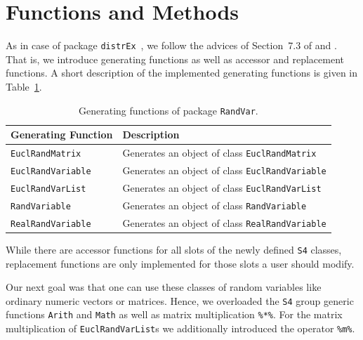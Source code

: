 \documentclass[11pt]{article}
\begin{document}
\section{Functions and Methods}
As in case of package {\tt distrEx}~\cite{distr}, we follow the advices of 
Section~7.3 of \cite{Cham:98} and \cite{Gent:03}. That is, we introduce 
generating functions as well as accessor and replacement functions. A short
description of the implemented generating functions is given in
Table~\ref{ap.Rpack.RandVar.tab.gen}.
\begin{table}[!ht]
\begin{center}
\begin{tabular}{p{4cm}|p{7.5cm}}
  \textbf{Generating Function} & \textbf{Description} \\ \hline\hline
  {\tt EuclRandMatrix} & Generates an object of class {\tt EuclRandMatrix}\\ \hline
  {\tt EuclRandVariable} & Generates an object of class {\tt EuclRandVariable}\\ \hline
  {\tt EuclRandVarList}   & Generates an object of class {\tt EuclRandVarList}\\ \hline
  {\tt RandVariable} & Generates an object of class {\tt RandVariable}\\ \hline
  {\tt RealRandVariable} & Generates an object of class {\tt RealRandVariable}
\end{tabular}
\caption[Generating Functions of Package {\tt RandVar}]{Generating
functions of package {\tt RandVar}.}\label{ap.Rpack.RandVar.tab.gen}%
\end{center}
\end{table}
\par\noindent
While there are accessor functions for all slots of the newly defined
{\tt S4} classes, replacement functions are only implemented for those
slots a user should modify.
\par
Our next goal was that one can use these classes of random variables like
ordinary numeric vectors or matrices. Hence, we overloaded the {\tt S4}
group generic functions {\tt Arith} and {\tt Math} as well as matrix
multiplication {\tt \%*\%}. For the matrix multiplication of {\tt EuclRandVarList}s 
we additionally introduced the operator {\tt \%m\%}.
\end{document}
